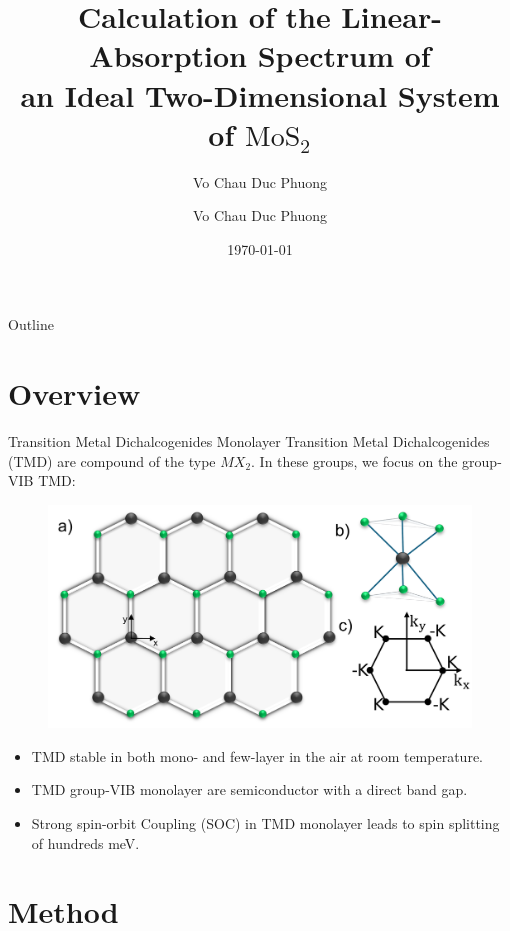 \documentclass{beamer}
\author{Vo Chau Duc Phuong}
\title{Calculation of the Linear-Absorption Spectrum of\\ an Ideal Two-Dimensional System of $\mathrm{MoS}_2$}
\author{Vo Chau Duc Phuong}
\date{\today}
\begin{document}
	\small
	\begin{frame}
		\titlepage 
	\end{frame}
	
	\logo{}
	
	
	\begin{frame}{Outline}
		\tableofcontents
	\end{frame}
	
	
	\section{Overview}	
	
	
	\begin{frame}{Transition Metal Dichalcogenides Monolayer}
		Transition Metal Dichalcogenides (TMD) are compound of the type $MX_2$. In these groups, we focus on the group-VIB TMD:
		\begin{figure}
			\includegraphics[width=0.4\linewidth]{images/RS.pdf}
		\end{figure}
		\begin{itemize}
			\item TMD stable in both mono- and few-layer in the air at room temperature.\\
			\item TMD group-VIB monolayer are semiconductor with a direct band gap.\\
			\item Strong spin-orbit Coupling (SOC) in TMD monolayer leads to spin splitting of hundreds meV.
		\end{itemize}
	\end{frame}
	\section{Method}
\end{document}

